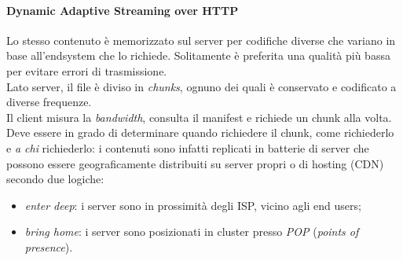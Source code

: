 \paragraph{Dynamic Adaptive Streaming over HTTP}
Lo stesso contenuto è memorizzato sul server per codifiche diverse che variano in base all'endsystem che lo richiede. Solitamente è preferita una qualità più bassa per evitare errori di trasmissione.\\
Lato server, il file è diviso in \textit{chunks}, ognuno dei quali è conservato e codificato a diverse frequenze.\\
Il client misura la \textit{bandwidth}, consulta il manifest e richiede un chunk alla volta. Deve essere in grado di determinare quando richiedere il chunk, come richiederlo e \textit{a chi} richiederlo: i contenuti sono infatti replicati in batterie di server che possono essere geograficamente distribuiti su server propri o di hosting (CDN) secondo due logiche:
\begin{itemize}
    \item \textit{enter deep}: i server sono in prossimità degli ISP, vicino agli end users;
    \item \textit{bring home}: i server sono posizionati in cluster presso \textit{POP} (\textit{points of presence}).
\end{itemize}


